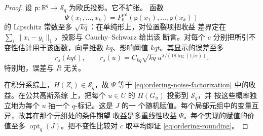 \begin{proof}
设 \(\mathsf p:\mathbb R^q\to\mathcal S_q\) 为欧氏投影。它不扩张。
函数
\[
 \Psi(x_1,\ldots,x_k)=
 P_0^{\mathrm{ml}}(\mathsf p(x_1),\ldots,\mathsf p(x_k))
\]
的 Lipschitz 常数至多 \(\sqrt{kq}\)：在单纯形上，对位置裂项把收益
差界定在 \(\sum_i\|x_i-y_i\|_1\)，投影与 Cauchy--Schwarz 给出该
断言。对每个 \(c\) 分别把所引不变性估计用于该函数，向量维数
\(kq\)、影响阈值 \(kqt\)。其显示的误差至多
\[
 r_s(kqt),\qquad
 r_s(u)=C_{kq}\sqrt{kq}\,
             u^{\lambda/(18\log(1/\alpha))}.
\]
特别地，误差与 \(R\) 无关。

在积分系综上，\(H(Z_i)\in\mathcal S_q\)，故 \(\Psi\) 等于
\eqref{eq:ordering-noise-factorization} 中的收益。在公共高斯系综
上，把每个 \(u\in U\) 的 \(H(G_u)\) 投影到 \(\mathcal S_q\)，并
按这些概率独立地为每个 \(u\) 抽一个 \(q\)-标记。这是 \(J\) 的一
个随机赋值。每个局部元组中的变量互异，故其在那个元组处的条件期望
收益是多重线性收益 \(\Psi\)。每个实现的赋值的价值至多
\(\operatorname{opt}_q(J)\)。把不变性比较对 \(c\) 取平均即证
\eqref{eq:ordering-rounding}。
\end{proof}

